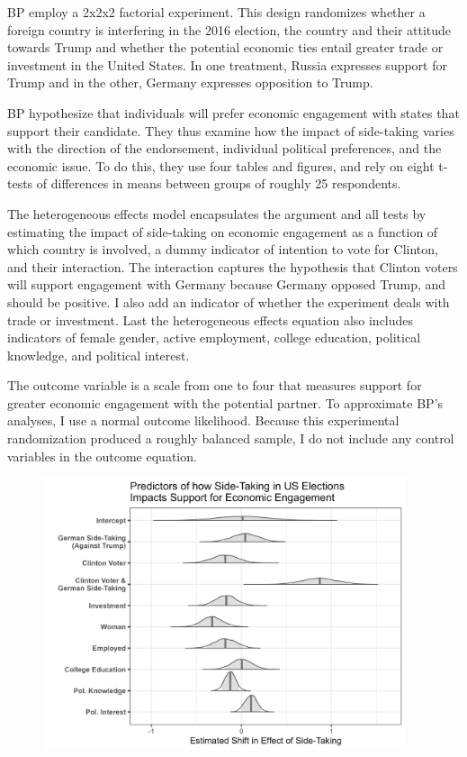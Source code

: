 \documentclass[12pt]{article}
\begin{document}
BP employ a 2x2x2 factorial experiment.
This design randomizes whether a foreign country is interfering in the 2016 election, the country and their attitude towards Trump and whether the potential economic ties entail greater trade or investment in the United States.
In one treatment, Russia expresses support for Trump and in the other, Germany expresses opposition to Trump. 


BP hypothesize that individuals will prefer economic engagement with states that support their candidate. 
They thus examine how the impact of side-taking varies with the direction of the endorsement, individual political preferences, and the economic issue. 
To do this, they use four tables and figures, and rely on eight t-tests of differences in means between groups of roughly 25 respondents. 


The heterogeneous effects model encapsulates the argument and all tests by estimating the impact of side-taking on economic engagement as a function of which country is involved, a dummy indicator of intention to vote for Clinton, and their interaction. 
The interaction captures the hypothesis that Clinton voters will support engagement with Germany because Germany opposed Trump, and should be positive. 
I also add an indicator of whether the experiment deals with trade or investment. 
Last the heterogeneous effects equation also includes indicators of female gender, active employment, college education, political knowledge, and political interest. 



The outcome variable is a scale from one to four that measures support for greater economic engagement with the potential partner. 
To approximate BP's analyses, I use a normal outcome likelihood. 
Because this experimental randomization produced a roughly balanced sample, I do not include any control variables in the outcome equation. 


\begin{figure}[htpb]
	\centering
		\includegraphics[width=0.95\textwidth]{../figures/bp-lambda.png}
	\caption{}
	\label{fig:bp-lambda}
\end{figure}
\end{document}
